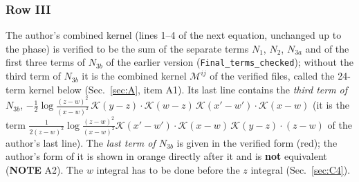 \subsubsection*{Row III}
The author's combined kernel (lines 1--4 of the next equation, unchanged up to the phase) is verified to be the sum of the separate terms $N_{1}$, $N_{2}$, $N_{3a}$ and of the first three terms of $N_{3b}$ of the earlier version (\texttt{Final\_terms\_checked}); without the third term of $N_{3b}$ it is the combined kernel $\mathcal{M}^{ij}$ of the verified files, called the 24-term kernel below (Sec.~\ref{sec:A}, item A1). Its last line contains the \emph{third term of $N_{3b}$}, $-\frac12\log\frac{(z-w)^{2}}{(x-w)^{2}}\,\mathcal{K}(y-z)\cdot\mathcal{K}(w-z)\,\mathcal{K}(x'-w')\cdot\mathcal{K}(x-w)$ (it is the term $\frac{1}{2(z-w)^{2}}\log\frac{(z-w)^{2}}{(x-w)^{2}}\mathcal{K}(x'-w')\cdot\mathcal{K}(x-w)\,\mathcal{K}(y-z)\cdot(z-w)$ of the author's last line). The \emph{last term of $N_{3b}$} is given in the verified form (red); the author's form of it is shown in orange directly after it and is \textbf{not} equivalent (\textbf{NOTE} A2). The $w$ integral has to be done before the $z$ integral (Sec.~\ref{sec:C4}).
